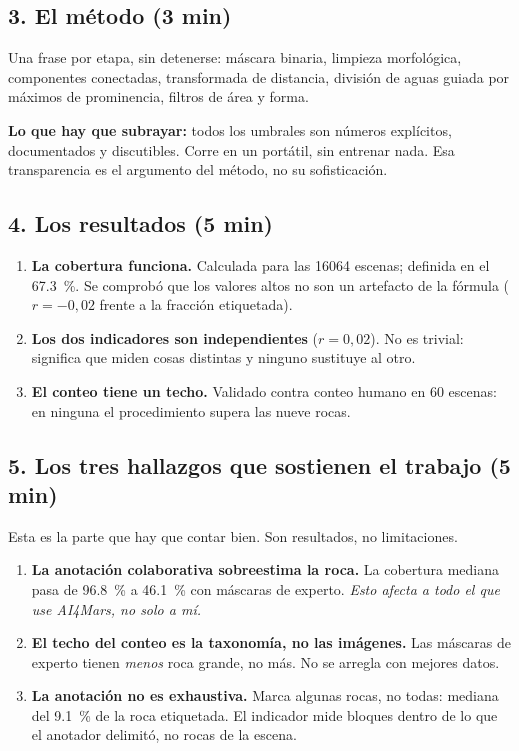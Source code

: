 \documentclass[11pt]{article}
\newcommand{\clave}[1]{\noindent\textbf{#1}}
\begin{document}
\subsection*{3. El método (3 min)}

Una frase por etapa, sin detenerse: máscara binaria, limpieza morfológica, componentes
conectadas, transformada de distancia, división de aguas guiada por máximos de prominencia,
filtros de área y forma.

\clave{Lo que hay que subrayar:} todos los umbrales son números explícitos, documentados y
discutibles. Corre en un portátil, sin entrenar nada. Esa transparencia es el argumento del
método, no su sofisticación.

\subsection*{4. Los resultados (5 min)}

\begin{enumerate}
  \item \textbf{La cobertura funciona.} Calculada para las \num{16064} escenas; definida en
    el \SI{67.3}{\percent}. Se comprobó que los valores altos no son un artefacto de la
    fórmula ($r = -0{,}02$ frente a la fracción etiquetada).
  \item \textbf{Los dos indicadores son independientes} ($r = 0{,}02$). No es trivial:
    significa que miden cosas distintas y ninguno sustituye al otro.
  \item \textbf{El conteo tiene un techo.} Validado contra conteo humano en \num{60}
    escenas: en ninguna el procedimiento supera las nueve rocas.
\end{enumerate}

\subsection*{5. Los tres hallazgos que sostienen el trabajo (5 min)}

Esta es la parte que hay que contar bien. Son resultados, no limitaciones.

\begin{enumerate}
  \item \textbf{La anotación colaborativa sobreestima la roca.} La cobertura mediana pasa
    de \SI{96.8}{\percent} a \SI{46.1}{\percent} con máscaras de experto. \emph{Esto afecta
    a todo el que use AI4Mars, no solo a mí.}
  \item \textbf{El techo del conteo es la taxonomía, no las imágenes.} Las máscaras de
    experto tienen \emph{menos} roca grande, no más. No se arregla con mejores datos.
  \item \textbf{La anotación no es exhaustiva.} Marca algunas rocas, no todas: mediana del
    \SI{9.1}{\percent} de la roca etiquetada. El indicador mide bloques dentro de lo que el
    anotador delimitó, no rocas de la escena.
\end{enumerate}
\end{document}
